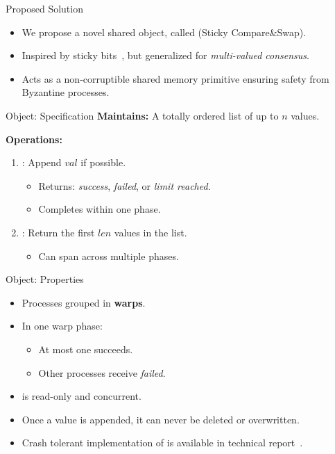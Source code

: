 \documentclass{beamer}
\begin{document}
\begin{frame}{Proposed Solution}
\begin{itemize}
  \item We propose a novel shared object, called \textbf{\BVCAS} (Sticky Compare\&Swap).
  \item Inspired by sticky bits~, but generalized for \textit{multi-valued consensus}.
  \item Acts as a non-corruptible shared memory primitive ensuring safety from Byzantine processes. 
\end{itemize}
\end{frame}



\begin{frame}{\BVCAS Object: Specification}
\textbf{Maintains:} A totally ordered list of up to $n$ values.  
\medskip

\textbf{Operations:}
\begin{enumerate}
  \item {}: Append $val$ if possible.
    \begin{itemize}
      \item Returns: \textit{success}, \textit{failed}, or \textit{limit reached}.
      \item Completes within one phase.
      
    \end{itemize}
  \item {}: Return the first $len$ values in the list.
  \begin{itemize}
  \item Can span across multiple phases.
  \end{itemize}
  
\end{enumerate}
\end{frame}

\begin{frame}{\BVCAS Object: Properties}
\begin{itemize}
  \item Processes grouped in \textbf{warps}.
  \item In one warp phase:
    \begin{itemize}
      \item At most one \Fwrite{} succeeds.
      \item Other processes receive \textit{failed}.
    \end{itemize}
  \item \Fview{} is read-only and concurrent.
  \item Once a value is appended, it can never be deleted or overwritten.
\item Crash tolerant implementation of \BVCAS is available in technical report~.
\end{itemize}
\end{frame}
\end{document}

